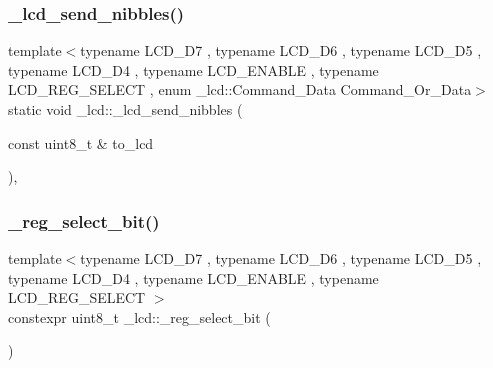 \hypertarget{namespace__lcd_ac9078fbd15fff6154396f468df3801a9}{}\label{namespace__lcd_ac9078fbd15fff6154396f468df3801a9} 
\subsubsection{\texorpdfstring{\+\_\+lcd\+\_\+send\+\_\+nibbles()}{\_lcd\_send\_nibbles()}}
{\footnotesize\ttfamily template$<$typename L\+C\+D\+\_\+\+D7 , typename L\+C\+D\+\_\+\+D6 , typename L\+C\+D\+\_\+\+D5 , typename L\+C\+D\+\_\+\+D4 , typename L\+C\+D\+\_\+\+E\+N\+A\+B\+LE , typename L\+C\+D\+\_\+\+R\+E\+G\+\_\+\+S\+E\+L\+E\+CT , enum \+\_\+lcd\+::\+Command\+\_\+\+Data Command\+\_\+\+Or\+\_\+\+Data$>$ \\
static void \+\_\+lcd\+::\+\_\+lcd\+\_\+send\+\_\+nibbles (\begin{DoxyParamCaption}\item[{const uint8\+\_\+t \&}]{to\+\_\+lcd }\end{DoxyParamCaption})\hspace{0.3cm}{\ttfamily [inline]}, {\ttfamily [static]}}

\hypertarget{namespace__lcd_ac6da9e91093b96ef074c72665e6dc649}{}\label{namespace__lcd_ac6da9e91093b96ef074c72665e6dc649} 
\subsubsection{\texorpdfstring{\+\_\+reg\+\_\+select\+\_\+bit()}{\_reg\_select\_bit()}}
{\footnotesize\ttfamily template$<$typename L\+C\+D\+\_\+\+D7 , typename L\+C\+D\+\_\+\+D6 , typename L\+C\+D\+\_\+\+D5 , typename L\+C\+D\+\_\+\+D4 , typename L\+C\+D\+\_\+\+E\+N\+A\+B\+LE , typename L\+C\+D\+\_\+\+R\+E\+G\+\_\+\+S\+E\+L\+E\+CT $>$ \\
constexpr uint8\+\_\+t \+\_\+lcd\+::\+\_\+reg\+\_\+select\+\_\+bit (\begin{DoxyParamCaption}{ }\end{DoxyParamCaption})\hspace{0.3cm}{\ttfamily [inline]}}

\hypertarget{namespace__lcd_adb3976e2d3fb582565fe36a693df65d1}{}\label{namespace__lcd_adb3976e2d3fb582565fe36a693df65d1} 
